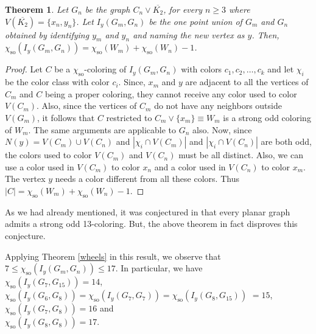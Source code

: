 \documentclass[12pt,a4paper]{article}
\newtheorem{theorem}{Theorem}
\theoremstyle{definition}
\numberwithin{equation}{section}
\begin{document}

\begin{theorem}
Let $G_n$ be the graph $C_n \vee \overline{K_2}$, for every $n \geq 3$ where $V(\overline{K_2}) = \{x_n,y_n\}$. Let $I_y(G_m,G_n)$ be the one point union of $G_m$ and $G_n$ obtained by identifying $y_m$ and $y_n$ and naming the new vertex as $y$. Then, $\chi_{\text{so}}(I_y(G_m,G_n)) = \chi_{\text{so}}(W_{m}) + \chi_{\text{so}}(W_n)-1$.
\end{theorem}

\begin{proof}
Let $C$ be a $\chi_\text{so}$-coloring of $I_y(G_m,G_n)$ with colors $c_1,c_2,\ldots,c_k$ and let $\chi_i$ be the color class with color $c_i$. Since, $x_m$ and $y$ are adjacent to all the vertices of $C_m$ and $C$ being a proper coloring, they cannot receive any color used to color $V(C_m)$. Also, since the vertices of $C_m$ do not have any neighbors outside $V(G_m)$, it follows that $C$ restricted to $C_m \vee \{x_m\} \equiv W_m$ is a strong odd coloring of $W_m$. The same arguments are applicable to $G_n$ also. Now, since $N(y) = V(C_m) \cup V(C_n)$ and $|\chi_i \cap V(C_m)|$ and $|\chi_i \cap V(C_n)|$ are both odd, the colors used to color $V(C_m)$ and $V(C_n)$ must be all distinct. Also, we can use a color used in $V(C_m)$ to color $x_n$ and a color used in $V(C_n)$ to color $x_m$. The vertex $y$ needs a color different from all these colors. Thus $|C| = \chi_{\text{so}}(W_{m}) + \chi_{\text{so}}(W_n)-1$.
\end{proof}
As we had already mentioned, it was conjectured in \cite{Pang} that every planar graph admits a strong odd 13-coloring. But, the above theorem in fact disproves this conjecture.

Applying Theorem \ref{wheels} in this result, we observe that $7 \leq \chi_{\text{so}}(I_y(G_m,G_n)) \leq 17$. In particular, we have\\
$\chi_{\text{so}}(I_y(G_7,G_{15})) = 14$,\\
$\chi_{\text{so}}(I_y(G_6,G_8)) = \chi_{\text{so}}(I_y(G_7,G_7)) = \chi_{\text{so}}(I_y(G_8,G_{15}))$ $ = 15$,\\
$\chi_{\text{so}}(I_y(G_7,G_8)) = 16$ and\\ $\chi_{\text{so}}(I_y(G_8,G_8)) = 17$.\par
\end{document}
